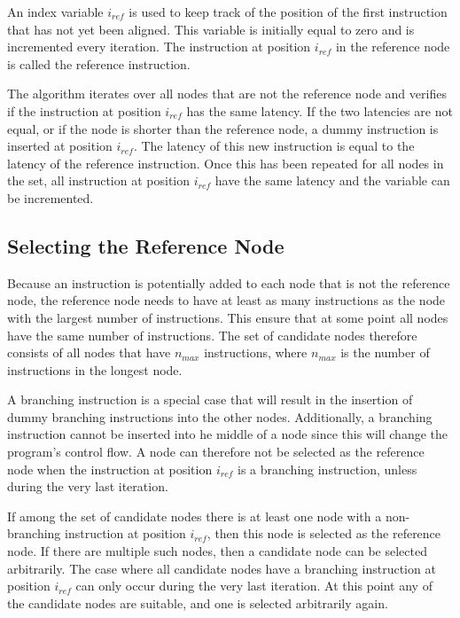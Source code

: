 An index variable $i_{ref}$ is used to keep track of the position of the first instruction that has not yet been aligned. 
This variable is initially equal to zero and is incremented every iteration. 
The instruction at position $i_{ref}$ in the reference node is called the reference instruction.

The algorithm iterates over all nodes that are not the reference node and verifies if the instruction at position $i_{ref}$ has the same latency. 
If the two latencies are not equal, or if the node is shorter than the reference node, a dummy instruction is inserted at position $i_{ref}$. 
The latency of this new instruction is equal to the latency of the reference instruction. 
Once this has been repeated for all nodes in the set, all instruction at position $i_{ref}$ have the same latency and the variable can be incremented. 


\subsection{Selecting the Reference Node}
Because an instruction is potentially added to each node that is not the reference node, the reference node needs to have at least as many instructions as the node with the largest number of instructions. 
This ensure that at some point all nodes have the same number of instructions. 
The set of candidate nodes therefore consists of all nodes that have $n_{max}$ instructions, where $n_{max}$ is the number of instructions in the longest node. 

A branching instruction is a special case that will result in the insertion of dummy branching instructions into the other nodes. 
Additionally, a branching instruction cannot be inserted into he middle of a node since this will change the program's control flow. 
A node can therefore not be selected as the reference node when the instruction at position $i_{ref}$ is a branching instruction, unless during the very last iteration.

If among the set of candidate nodes there is at least one node with a non-branching instruction at position $i_{ref}$, then this node is selected as the reference node. 
If there are multiple such nodes, then a candidate node can be selected arbitrarily. 
The case where all candidate nodes have a branching instruction at position $i_{ref}$ can only occur during the very last iteration. 
At this point any of the candidate nodes are suitable, and one is selected arbitrarily again. 


